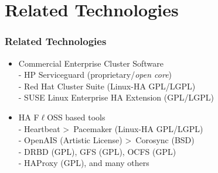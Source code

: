 \section{Related Technologies}

\begin{frame}%
\frametitle{Related Technologies}

\begin{itemize}
  \item Commercial Enterprise Cluster Software\\
	- HP Serviceguard (proprietary/\textit{open core})\\
	- Red Hat Cluster Suite (Linux-HA GPL/LGPL)\\
	- SUSE Linux Enterprise HA Extension (GPL/LGPL)

  \vspace{0.5cm}
	
  \item HA F$\ell$OSS based tools\\
	- Heartbeat \textgreater\ Pacemaker (Linux-HA GPL/LGPL)\\
	- OpenAIS (Artistic License) \textgreater\ Corosync (BSD)\\
	- DRBD (GPL), GFS (GPL), OCFS (GPL)\\
	- HAProxy (GPL), and many others
  
\end{itemize}

\end{frame}